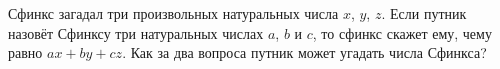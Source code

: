 Сфинкс загадал три произвольных натуральных числа $x$, $y$, $z$. Если путник назовёт Сфинксу три натуральных числах $a$, $b$ и $c$, то сфинкс скажет ему, чему равно $ax + by + cz$. Как за два вопроса путник может угадать числа Сфинкса?